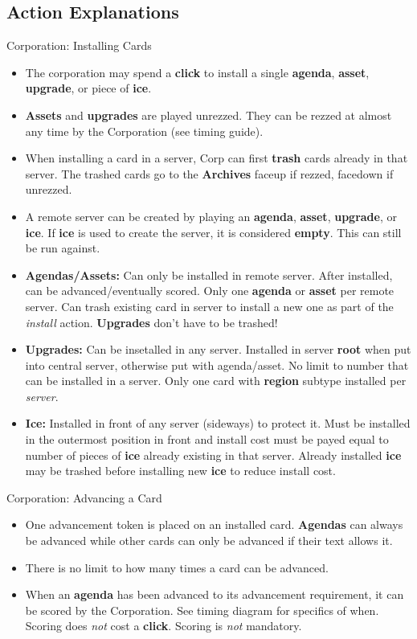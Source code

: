 \documentclass[12pt]{article}
\newenvironment{itemizeCustom}
{\begin{itemize}
  \setlength{\itemsep}{1pt}
  \setlength{\parskip}{0pt}
  \setlength{\parsep}{0pt}}
{\end{itemize}}
\begin{document}
\begin{multicols*}{2}
\section*{Action Explanations}
Corporation: Installing Cards
\begin{itemizeCustom}
	\item The corporation may spend a \textbf{click} to install a single \textbf{agenda}, \textbf{asset}, \textbf{upgrade}, or piece of \textbf{ice}. 
	\item \textbf{Assets} and \textbf{upgrades} are played unrezzed. They can be rezzed at almost any time by the Corporation (see timing guide).
	\item When installing a card in a server, Corp can first \textbf{trash} cards already in that server. The trashed cards go to the \textbf{Archives} faceup if rezzed, facedown if unrezzed.
	\item A remote server can be created by playing an \textbf{agenda}, \textbf{asset}, \textbf{upgrade}, or \textbf{ice}. If \textbf{ice} is used to create the server, it is considered \textbf{empty}. This can still be run against.
	\item \textbf{Agendas/Assets:} Can only be installed in remote server. After installed, can be advanced/eventually scored. Only one \textbf{agenda} or \textbf{asset} per remote server. Can trash existing card in server to install a new one as part of the \emph{install} action. \textbf{Upgrades} don't have to be trashed!
	\item \textbf{Upgrades:} Can be insetalled in any server. Installed in server \textbf{root} when put into central server, otherwise put with agenda/asset. No limit to number that can be installed in a server. Only one card with \textbf{region} subtype installed per \emph{server}.
	\item \textbf{Ice:} Installed in front of any server (sideways) to protect it. Must be installed in the outermost position in front and install cost must be payed equal to number of pieces of \textbf{ice} already existing in that server. Already installed \textbf{ice} may be trashed before installing new \textbf{ice} to reduce install cost.
\end{itemizeCustom}

Corporation: Advancing a Card
\begin{itemizeCustom}
	\item One advancement token is placed on an installed card. \textbf{Agendas} can always be advanced while other cards can only be advanced if their text allows it. 
	\item There is no limit to how many times a card can be advanced. 
	\item When an \textbf{agenda} has been advanced to its advancement requirement, it can be scored by the Corporation. See timing diagram for specifics of when. Scoring does \emph{not} cost a \textbf{click}. Scoring is \emph{not} mandatory.
\end{itemizeCustom}


\end{multicols*}
\end{document}
